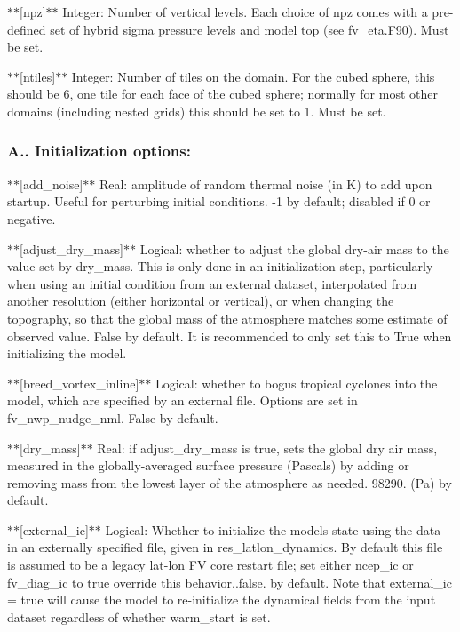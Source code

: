 $\ast$$\ast$\mbox{[}npz\mbox{]}$\ast$$\ast$ Integer\-: Number of vertical levels. Each choice of npz comes with a pre-\/defined set of hybrid sigma pressure levels and model top (see fv\-\_\-eta.\-F90). Must be set.

$\ast$$\ast$\mbox{[}ntiles\mbox{]}$\ast$$\ast$ Integer\-: Number of tiles on the domain. For the cubed sphere, this should be 6, one tile for each face of the cubed sphere; normally for most other domains (including nested grids) this should be set to 1. Must be set.

\subsubsection*{A.. Initialization options\-:}

$\ast$$\ast$\mbox{[}add\-\_\-noise\mbox{]}$\ast$$\ast$ Real\-: amplitude of random thermal noise (in K) to add upon startup. Useful for perturbing initial conditions. -\/1 by default; disabled if 0 or negative.

$\ast$$\ast$\mbox{[}adjust\-\_\-dry\-\_\-mass\mbox{]}$\ast$$\ast$ Logical\-: whether to adjust the global dry-\/air mass to the value set by dry\-\_\-mass. This is only done in an initialization step, particularly when using an initial condition from an external dataset, interpolated from another resolution (either horizontal or vertical), or when changing the topography, so that the global mass of the atmosphere matches some estimate of observed value. False by default. It is recommended to only set this to True when initializing the model.

$\ast$$\ast$\mbox{[}breed\-\_\-vortex\-\_\-inline\mbox{]}$\ast$$\ast$ Logical\-: whether to bogus tropical cyclones into the model, which are specified by an external file. Options are set in fv\-\_\-nwp\-\_\-nudge\-\_\-nml. False by default.

$\ast$$\ast$\mbox{[}dry\-\_\-mass\mbox{]}$\ast$$\ast$ Real\-: if adjust\-\_\-dry\-\_\-mass is true, sets the global dry air mass, measured in the globally-\/averaged surface pressure (Pascals) by adding or removing mass from the lowest layer of the atmosphere as needed. 98290. (Pa) by default.

$\ast$$\ast$\mbox{[}external\-\_\-ic\mbox{]}$\ast$$\ast$ Logical\-: Whether to initialize the models state using the data in an externally specified file, given in res\-\_\-latlon\-\_\-dynamics. By default this file is assumed to be a legacy lat-\/lon F\-V core restart file; set either ncep\-\_\-ic or fv\-\_\-diag\-\_\-ic to true override this behavior..false. by default. Note that external\-\_\-ic = true will cause the model to re-\/initialize the dynamical fields from the input dataset regardless of whether warm\-\_\-start is set.

